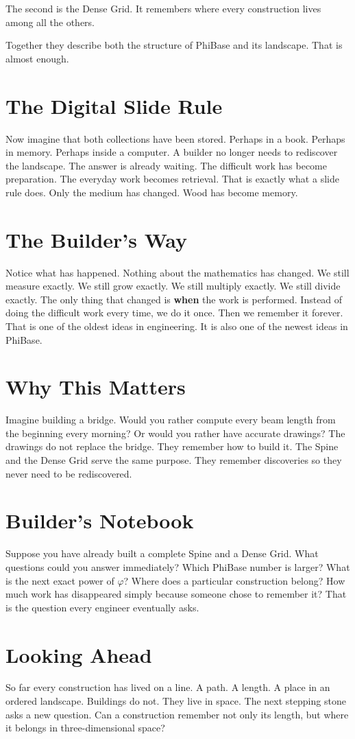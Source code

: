 The second is the Dense Grid. It remembers where every construction lives among all the others.

Together they describe both the structure of PhiBase and its landscape. That is almost enough.

\section*{The Digital Slide Rule}

Now imagine that both collections have been stored. Perhaps in a book. Perhaps in memory. Perhaps inside a computer. A builder no longer needs to rediscover the landscape. The answer is already waiting. The difficult work has become preparation. The everyday work becomes retrieval. That is exactly what a slide rule does. Only the medium has changed. Wood has become memory.

\section*{The Builder's Way}

Notice what has happened. Nothing about the mathematics has changed. We still measure exactly. We still grow exactly. We still multiply exactly. We still divide exactly. The only thing that changed is \textbf{when} the work is performed. Instead of doing the difficult work every time, we do it once. Then we remember it forever. That is one of the oldest ideas in engineering. It is also one of the newest ideas in PhiBase.

\section*{Why This Matters}

Imagine building a bridge. Would you rather compute every beam length from the beginning every morning? Or would you rather have accurate drawings? The drawings do not replace the bridge. They remember how to build it. The Spine and the Dense Grid serve the same purpose. They remember discoveries so they never need to be rediscovered.

\section*{Builder's Notebook}

Suppose you have already built a complete Spine and a Dense Grid. What questions could you answer immediately? Which PhiBase number is larger? What is the next exact power of \(\varphi\)? Where does a particular construction belong? How much work has disappeared simply because someone chose to remember it? That is the question every engineer eventually asks.

\section*{Looking Ahead}

So far every construction has lived on a line. A path. A length. A place in an ordered landscape. Buildings do not. They live in space. The next stepping stone asks a new question. Can a construction remember not only its length, but where it belongs in three-dimensional space?

